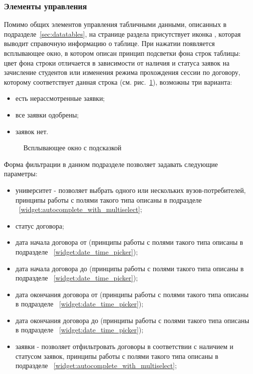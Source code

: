\subsubsection{Элементы управления}
Помимо общих элементов управления табличными данными, описанных в подразделе~\ref{sec:datatables}, на странице раздела присутствует 
иконка  , которая выводит справочную информацию о таблице. 
При нажатии появляется всплывающее окно, в котором описан принцип подсветки фона строк таблицы: 
цвет фона строки отличается в зависимости от наличия и статуса заявок на зачисление студентов или изменения режима прохождения сессии по договору, которому соответствует  данная строка (см. рис.~\ref{agreement:table_help_legend}), возможны три варианта:
\begin{itemize}
	\item есть нерассмотренные заявки;
	\item все заявки одобрены;
	\item заявок нет.
\end{itemize}	
\begin{figure}[H]
\caption{Всплывающее окно с подсказкой}
\label{agreement:table_help_legend}
\end{figure}	

Форма фильтрации в данном подразделе позволяет задавать следующие параметры:
\begin{itemize}
	\item университет - позволяет выбрать одного или нескольких вузов-потребителей, принципы работы с полями такого типа описаны в подразделе ~\ref{widget:autocomplete_with_multiselect};
	\item статус договора;
	\item дата начала договора от (принципы работы с полями такого типа описаны в подразделе ~\ref{widget:date_time_picker});
	\item дата начала договора до (принципы работы с полями такого типа описаны в подразделе ~\ref{widget:date_time_picker});
	\item дата окончания договора от (принципы работы с полями такого типа описаны в подразделе ~\ref{widget:date_time_picker});
	\item дата окончания договора до (принципы работы с полями такого типа описаны в подразделе ~\ref{widget:date_time_picker});
	\item заявки - позволяет отфильтровать договоры в соответствии с наличием и статусом заявок, принципы работы с полями такого типа описаны в подразделе ~\ref{widget:autocomplete_with_multiselect};
\end{itemize}

